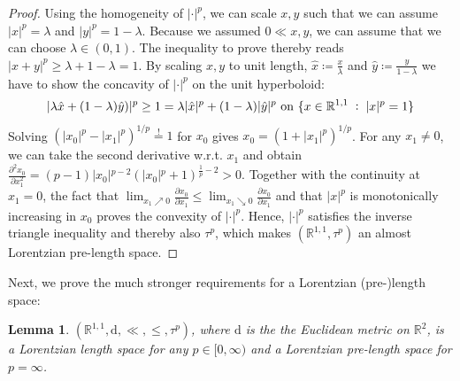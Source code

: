 \documentclass[11pt, a4paper]{article} %
\newcommand{\R}{\mathbb{R}} %
\newcommand{\dd}{\text{d}} %
\newtheorem{lemma}[definition]{Lemma}
\theoremstyle{plain} %
\newcommand{\mDef}{\coloneqq }
\newcommand{\pp}{\; \vcentcolon \;}
\begin{document}
\begin{proof}
Using the homogeneity of $|\cdot|^p$, we can scale $x,y$ such that we can assume $|x|^p=\lambda$ and $|y|^p=1-\lambda$. Because we assumed $0\ll x,y$, we can assume that we can choose $\lambda\in(0,1)$.
The inequality to prove thereby reads $ |x+y|^p \geq \lambda+ 1-\lambda =1$.
By scaling $x,y$ to unit length, $\hat{x}\mDef\frac{x}{\lambda}$ and $\hat{y}\mDef\frac{y}{1-\lambda}$ we have to show the concavity of $|\cdot|^p$ on the unit hyperboloid: 
\begin{equation*}
    |\lambda\hat{x} + (1-\lambda)\hat{y})|^p \geq 1 = \lambda |\hat{x}|^p + (1-\lambda) |\hat{y}|^p \text{ on }\{ x\in\R^{1,1} \pp |x|^p=1 \}
\end{equation*}
Solving $\left(|x_0|^p-|x_1|^p\right)^{1/p}\overset{!}{=}1$ for $x_0$ gives $x_0 = \left( 1+|x_1|^p \right)^{1/p}$.
For any $x_1\neq 0$, we can take the second derivative w.r.t. $x_1$ and obtain
$\frac{\partial^2 x_0}{\partial x_1^2} = (p-1) \left| x_0\right| {}^{p-2} \left(\left| x_0\right| {}^p+1\right){}^{\frac{1}{p}-2} > 0$. Together with the continuity at $x_1=0$,
the fact that $\lim_{x_1 \nearrow 0} \frac{\partial x_0}{\partial x_1} \leq \lim_{x_1 \searrow 0} \frac{\partial x_0}{\partial x_1}$ and that $|x|^p$ is monotonically increasing in $x_0$ proves the convexity of $|\cdot|^p$.
    Hence, $|\cdot|^p$ satisfies the inverse triangle inequality and thereby also $\tau^p$, which makes $(\R^{1,1},\tau^{p})$ an almost Lorentzian pre-length space. 
\end{proof}
Next, we prove the much stronger requirements for a Lorentzian (pre-)length space:
\begin{lemma}
\label{lem_isLorLenSP}
$(\R^{1,1},\dd,\ll,\leq,\tau^p)$, where $\dd$ is the the Euclidean metric on $\R^2$, is a Lorentzian length space for any $p\in [0,\infty)$ and a Lorentzian pre-length space for $p=\infty$.
\end{lemma}
\end{document}
